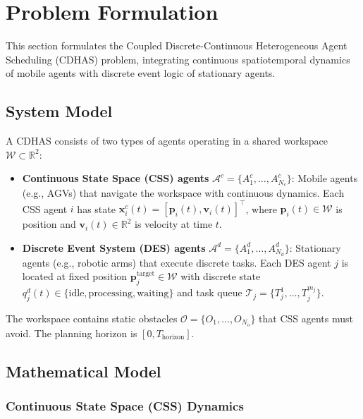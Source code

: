 \documentclass[manuscript,screen,review]{acmart}
\begin{document}
\section{Problem Formulation}
\label{sec:Chapter_III}

This section formulates the Coupled Discrete-Continuous Heterogeneous Agent 
Scheduling (CDHAS) problem, integrating continuous spatiotemporal dynamics 
of mobile agents with discrete event logic of stationary agents.

\subsection{System Model}

A CDHAS consists of two types of agents operating in a shared workspace 
$\mathcal{W} \subset \mathbb{R}^2$:

\begin{itemize}[leftmargin=*, itemsep=3pt]
    \item \textbf{Continuous State Space (CSS) agents} $\mathcal{A}^c = \{A_1^c, \ldots, A_{N_c}^c\}$: 
    Mobile agents (e.g., AGVs) that navigate the workspace with continuous 
    dynamics. Each CSS agent $i$ has state $\mathbf{x}_i^c(t) = [\mathbf{p}_i(t), \mathbf{v}_i(t)]^\top$, 
    where $\mathbf{p}_i(t) \in \mathcal{W}$ is position and $\mathbf{v}_i(t) \in \mathbb{R}^2$ 
    is velocity at time $t$.
    
    \item \textbf{Discrete Event System (DES) agents} $\mathcal{A}^d = \{A_1^d, \ldots, A_{N_d}^d\}$: 
    Stationary agents (e.g., robotic arms) that execute discrete tasks. Each 
    DES agent $j$ is located at fixed position $\mathbf{p}_j^{\text{target}} \in \mathcal{W}$ 
    with discrete state $q_j^d(t) \in \{\text{idle}, \text{processing}, \text{waiting}\}$ 
    and task queue $\mathcal{T}_j = \{T_j^1, \ldots, T_j^{m_j}\}$.
\end{itemize}

The workspace contains static obstacles $\mathcal{O} = \{O_1, \ldots, O_{N_o}\}$ 
that CSS agents must avoid. The planning horizon is $[0, T_{\text{horizon}}]$.

\subsection{Mathematical Model}

\subsubsection{Continuous State Space (CSS) Dynamics}
\end{document}

